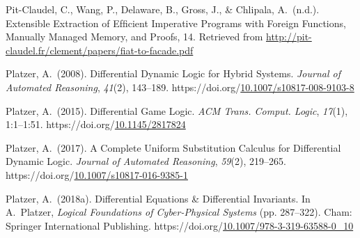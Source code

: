 \documentclass[12pt,twoside]{article}
\begin{document}
{\begin{thebibliography}{222}
Pit-Claudel, C., Wang, P., Delaware, B., Gross, J., \& Chlipala, A.~(n.d.). Extensible Extraction of Efﬁcient Imperative Programs with Foreign Functions, Manually Managed Memory, and Proofs, 14. Retrieved from \href{http://pit-claudel.fr/clement/papers/fiat-to-facade.pdf}{{\ttfamily http://\hspace{0pt}pit-\hspace{0pt}claudel.\hspace{0pt}fr/\hspace{0pt}clement/\hspace{0pt}papers/\hspace{0pt}fiat-\hspace{0pt}to-\hspace{0pt}facade.\hspace{0pt}pdf}}\label{pit-claudel_extensible_nodate}%

Platzer, A.~(2008). Differential Dynamic Logic for Hybrid Systems. \emph{Journal of Automated Reasoning}, \emph{41}(2), 143–189. https://doi.org/\href{https://dx.doi.org/10.1007/s10817-008-9103-8}{10.1007/s10817-008-9103-8}\label{platzer_differential_2008}%

Platzer, A.~(2015). Differential Game Logic. \emph{ACM Trans. Comput. Logic}, \emph{17}(1), 1:1–1:51. https://doi.org/\href{https://dx.doi.org/10.1145/2817824}{10.1145/2817824}\label{platzer_differential_2015}%

Platzer, A.~(2017). A Complete Uniform Substitution Calculus for Differential Dynamic Logic. \emph{Journal of Automated Reasoning}, \emph{59}(2), 219–265. https://doi.org/\href{https://dx.doi.org/10.1007/s10817-016-9385-1}{10.1007/s10817-016-9385-1}\label{platzer_complete_2017}%

Platzer, A.~(2018a). Differential Equations \& Differential Invariants. In A.~Platzer, \emph{Logical Foundations of Cyber-Physical Systems} (pp. 287–322). Cham: Springer International Publishing. https://doi.org/\href{https://dx.doi.org/10.1007/978-3-319-63588-0_10}{10.1007/978-3-319-63588-0\_10}\label{platzer_differential_2018}%


\end{thebibliography}}
\end{document}
